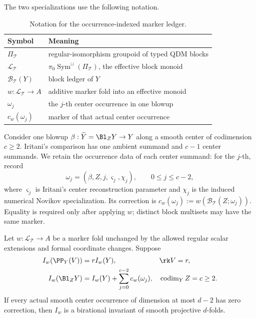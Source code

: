 The two specializations use the following notation.
\begin{table}[ht]
\centering
\begin{tabular}{@{}ll@{}}
\toprule
Symbol & Meaning \\
\midrule
\(\Pi_{\mathcal T}\) & regular-isomorphism groupoid of typed QDM blocks \\
\(\mathcal L_{\mathcal T}\) &
  \(\pi_0\operatorname{Sym}^{\sqcup}(\Pi_{\mathcal T})\), the effective block monoid \\
\(\mathcal B_{\mathcal T}(Y)\) & block ledger of \(Y\) \\
\(w:\mathcal L_{\mathcal T}\to A\) & additive marker fold into an effective monoid \\
\(\omega_j\) & the \(j\)-th center occurrence in one blowup \\
\(c_w(\omega_j)\) & marker of that actual center occurrence \\
\bottomrule
\end{tabular}
\caption{Notation for the occurrence-indexed marker ledger.}
\label{tab:marker-notation}
\end{table}

Consider one blowup
\(\beta:\widetilde Y=\Bl_ZY\to Y\) along a smooth center of codimension
\(c\ge2\).  Iritani's comparison has one ambient summand and \(c-1\) center
summands.  We retain the occurrence data of each center summand: for the
\(j\)-th, record
\[
 \omega_j=(\beta,Z,j,\varsigma_j,\chi_j),
 \qquad 0\le j\le c-2,
\]
where \(\varsigma_j\) is Iritani's center reconstruction parameter and
\(\chi_j\) is the induced numerical Novikov specialization.  Its correction
is
\(c_w(\omega_j):=w(\mathcal B_{\mathcal T}(Z;\omega_j))\).  Equality is
required only after applying \(w\); distinct block multisets may have the same
marker.

\begin{theorem}
\label{thm:marker-ledger}
%
%
%
Let \(w:\mathcal L_{\mathcal T}\to A\) be a marker fold unchanged by the
allowed regular scalar extensions and formal coordinate changes.  Suppose
\begin{align}
 I_w(\PP_Y(V))&=rI_w(Y),
 &&\rk V=r,                                      \label{eq:marker-pbundle}\\
 I_w(\Bl_ZY)&=I_w(Y)+\sum_{j=0}^{c-2}c_w(\omega_j),
 &&\operatorname{codim}_YZ=c\ge2.                \label{eq:marker-blowup}
\end{align}
If every actual smooth center occurrence of dimension at most \(d-2\) has
zero correction, then \(I_w\) is a birational invariant of smooth projective
\(d\)-folds.
\end{theorem}

